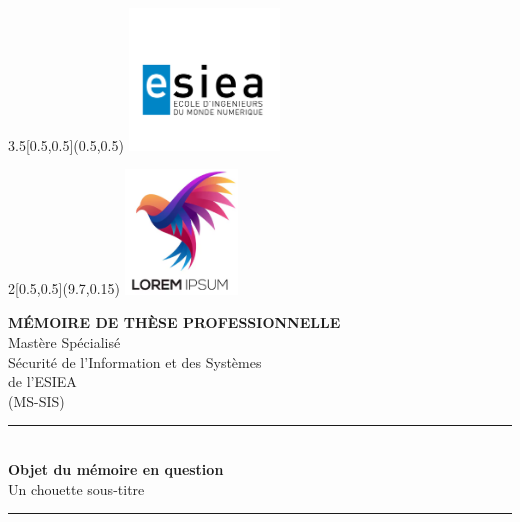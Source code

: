 
\begin{titlepage}
\begin{textblock}{3.5}[0.5,0.5](0.5,0.5)
	\includegraphics[width=4cm]{Images/00/LogoEsiea.png}\\[4cm]
  \end{textblock}
  
\begin{textblock}{2}[0.5,0.5](9.7,0.15)
 \includegraphics[width=3cm]{Images/00/lorem.png}\\[2cm]   
  \end{textblock}
  
\bigskip
\begin{center}

\vspace{1cm}
{\large \textbf{MÉMOIRE DE THÈSE PROFESSIONNELLE}}\\[0.6cm]

{ \large{Mastère Spécialisé\\[0.2cm]
Sécurité de l'Information et des Systèmes\\[0.2cm]
de l'ESIEA\\[0.2cm]
(MS-SIS)}}
\\[1cm]
\rule{\linewidth}{0.5mm} \\[0.5cm]
{ \huge \bfseries Objet du mémoire en question
 \\[0.5cm] }
\large Un chouette sous-titre 
\rule{\linewidth}{0.5mm} \\[1.5cm]

\noindent


\end{center}
\end{titlepage}
